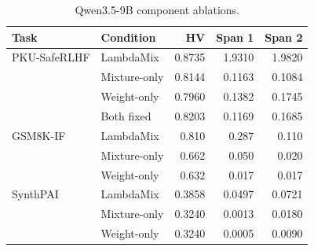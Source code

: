 \begin{table}
\vspace{-20pt}
\centering\small
\caption{Qwen3.5-9B component ablations.}
\label{tab:q9-mechanism}
\begingroup
\setlength{\tabcolsep}{2.5pt}
\renewcommand{\arraystretch}{0.96}
\begin{tabular}{@{}llrrr@{}}
\toprule
Task & Condition & HV & Span 1 & Span 2\\
\midrule
PKU-SafeRLHF & LambdaMix & 0.8735 & 1.9310 & 1.9820\\
 & Mixture-only & 0.8144 & 0.1163 & 0.1084\\
 & Weight-only & 0.7960 & 0.1382 & 0.1745\\
 & Both fixed & 0.8203 & 0.1169 & 0.1685\\
\midrule
GSM8K-IF & LambdaMix & 0.810 & 0.287 & 0.110\\
 & Mixture-only & 0.662 & 0.050 & 0.020\\
 & Weight-only & 0.632 & 0.017 & 0.017\\
\midrule
SynthPAI & LambdaMix & 0.3858 & 0.0497 & 0.0721\\
 & Mixture-only & 0.3240 & 0.0013 & 0.0180\\
 & Weight-only & 0.3240 & 0.0005 & 0.0090\\
\bottomrule
\end{tabular}
\endgroup
\end{table}
